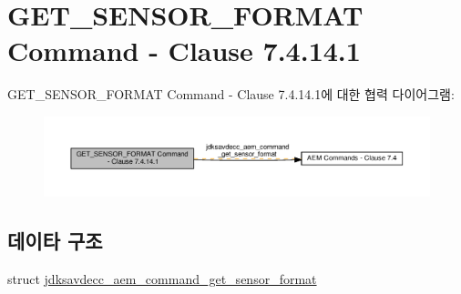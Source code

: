 \hypertarget{group__command__get__sensor__format}{}\section{G\+E\+T\+\_\+\+S\+E\+N\+S\+O\+R\+\_\+\+F\+O\+R\+M\+AT Command -\/ Clause 7.4.14.1}
\label{group__command__get__sensor__format}
G\+E\+T\+\_\+\+S\+E\+N\+S\+O\+R\+\_\+\+F\+O\+R\+M\+AT Command -\/ Clause 7.4.14.1에 대한 협력 다이어그램\+:
\nopagebreak
\begin{figure}[H]
\begin{center}
\leavevmode
\includegraphics[width=350pt]{group__command__get__sensor__format}
\end{center}
\end{figure}
\subsection*{데이타 구조}
\begin{DoxyCompactItemize}
\item 
struct \hyperlink{structjdksavdecc__aem__command__get__sensor__format}{jdksavdecc\+\_\+aem\+\_\+command\+\_\+get\+\_\+sensor\+\_\+format}
\end{DoxyCompactItemize}
